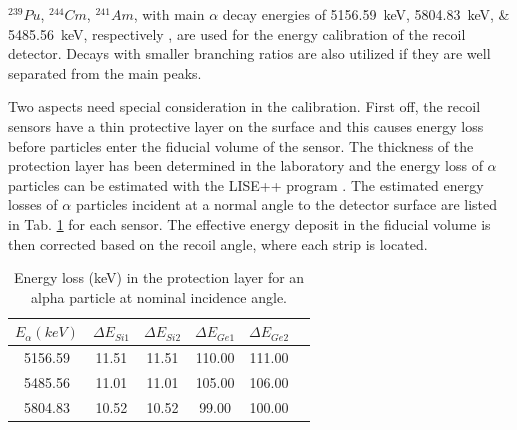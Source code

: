 \documentclass[number,5p]{elsarticle}
\begin{document}
\(^{239}Pu\), \(^{244}Cm\), \(^{241}Am\), with main $\alpha$ decay energies
of \SIlist{5156.59;5804.83;5485.56}{\keV}, respectively \cite{nuclear_data}, are
used for the energy calibration of the recoil detector.
Decays with smaller branching ratios are also utilized if they are well separated from the main peaks.

Two aspects need special consideration in the calibration.
First off, the recoil sensors have a thin protective layer on the surface and this
causes energy loss before particles enter the fiducial volume of the sensor.
The thickness of the protection layer has been determined in the laboratory
\cite{recoil_article} and the energy loss of $\alpha$ particles can be estimated
with the LISE++ program \cite{LISE}.
The estimated energy losses of $\alpha$ particles incident at a normal angle to
the detector surface are listed in Tab. \ref{tab:dead_layer} for each sensor.
The effective energy deposit in the fiducial volume is then corrected based on the recoil angle, where each strip is located.
\begin{table}[h!]
  \centering
  \caption{Energy loss (\si{\keV}) in the protection layer for an alpha particle
    at nominal incidence angle.}
  \label{tab:dead_layer}
  \begin{tabular}{cccccc}
    \hline
    \(E_{\alpha} (keV)\) & \(\Delta E_{Si1}\) & \(\Delta E_{Si2}\) & \(\Delta E_{Ge1}\) & \(\Delta E_{Ge2}\) \\
    \hline
    5156.59 & 11.51 & 11.51 & 110.00 & 111.00 \\
    5485.56 & 11.01 & 11.01 & 105.00 & 106.00 \\
    5804.83 & 10.52 & 10.52 & 99.00  & 100.00 \\
    \hline
  \end{tabular}
\end{table}
\end{document}
